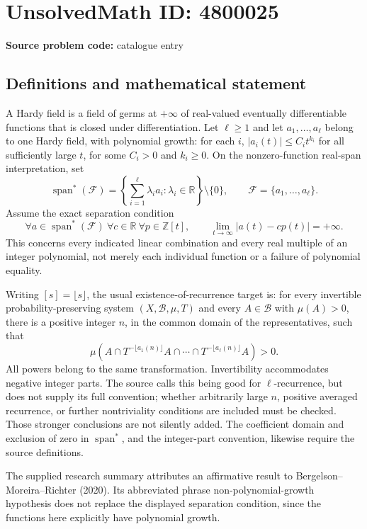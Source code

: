 \documentclass[11pt]{article}
\newcommand{\Z}{\mathbb{Z}}
\newcommand{\R}{\mathbb{R}}
\begin{document}
\section*{UnsolvedMath ID: 4800025}
\textbf{Source problem code:} catalogue entry
\subsection{Definitions and mathematical statement}
A Hardy field is a field of germs at \(+\infty\) of real-valued eventually differentiable functions that is closed under differentiation. Let \(\ell\ge1\) and let \(a_1,\ldots,a_\ell\) belong to one Hardy field, with polynomial growth: for each \(i\), \(|a_i(t)|\le C_i t^{k_i}\) for all sufficiently large \(t\), for some \(C_i>0\) and \(k_i\ge0\). On the nonzero-function real-span interpretation, set
\[
\operatorname{span}^*(\mathcal F)=
\left\{\sum_{i=1}^\ell\lambda_i a_i:\lambda_i\in\R\right\}\setminus\{0\},
\qquad\mathcal F=\{a_1,\ldots,a_\ell\}.
\]
Assume the exact separation condition
\[
\forall a\in\operatorname{span}^*(\mathcal F)\ \forall c\in\R\ \forall p\in\Z[t],
\qquad \lim_{t\to\infty}|a(t)-cp(t)|=+\infty.
\]
This concerns every indicated linear combination and every real multiple of an integer polynomial, not merely each individual function or a failure of polynomial equality.

Writing \([s]=\lfloor s\rfloor\), the usual existence-of-recurrence target is: for every invertible probability-preserving system \((X,\mathcal B,\mu,T)\) and every \(A\in\mathcal B\) with \(\mu(A)>0\), there is a positive integer \(n\), in the common domain of the representatives, such that
\[
\mu\left(A\cap T^{-\lfloor a_1(n)\rfloor}A\cap\cdots
\cap T^{-\lfloor a_\ell(n)\rfloor}A\right)>0.
\]
All powers belong to the same transformation. Invertibility accommodates negative integer parts. The source calls this being good for \(\ell\)-recurrence, but does not supply its full convention; whether arbitrarily large \(n\), positive averaged recurrence, or further nontriviality conditions are included must be checked. Those stronger conclusions are not silently added. The coefficient domain and exclusion of zero in \(\operatorname{span}^*\), and the integer-part convention, likewise require the source definitions.

The supplied research summary attributes an affirmative result to Bergelson--Moreira--Richter (2020). Its abbreviated phrase non-polynomial-growth hypothesis does not replace the displayed separation condition, since the functions here explicitly have polynomial growth.
\end{document}
